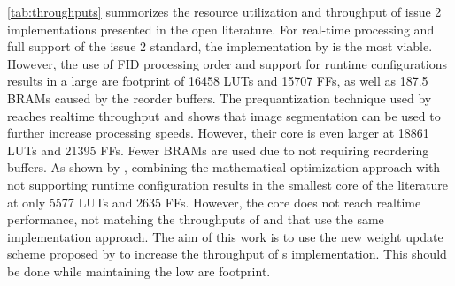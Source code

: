 \autoref{tab:throughputs} summorizes the resource utilization and throughput of issue 2 implementations presented in the open literature. For real-time processing and full support of the issue 2 standard, the implementation by \citeauthor{basconesRealTimeFPGAImplementation2022} is the most viable. However, the use of \acrshort{FID} processing order and support for runtime configurations results in a large are footprint of 16458 LUTs and 15707 FFs, as well as 187.5 BRAMs caused by the reorder buffers. The prequantization technique used by \citeauthor{chatziantoniouScalableDataRateNearLossless2022a} reaches realtime throughput and shows that image segmentation can be used to further increase processing speeds. However, their core is even larger at 18861 LUTs and 21395 FFs. Fewer BRAMs are used due to not requiring reordering buffers. As shown by \citeauthor{vorhaugHyperspectralImageCompression2024}, combining the mathematical optimization approach with not supporting runtime configuration results in the smallest core of the literature at only 5577 LUTs and 2635 FFs. However, the core does not reach realtime performance, not matching the throughputs of \citeauthor{sanchezReducingDataDependencies2022} and \citeauthor{barriosRemovingDataDependencies2024} that use the same implementation approach. The aim of this work is to use the new weight update scheme proposed by \citeauthor{jiaRemovalFeedbackLoop2025} to increase the throughput of \citeauthor{vorhaugHyperspectralImageCompression2024}s implementation. This should be done while maintaining the low are footprint.

